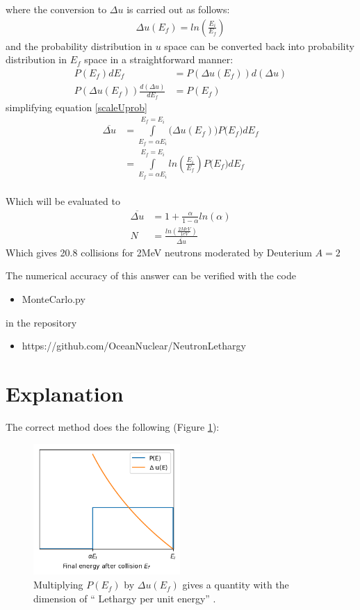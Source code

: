 \documentclass[a4paper, 12pt]{article}
\begin{document}
where the conversion to $\Delta u$ is carried out as follows:
\begin{align}
	\Delta u (E_f) = ln\left(\frac{E_i}{E_f} \right)
\end{align}
and the probability distribution in $u$ space can be converted back into probability distribution in $E_f$ space in a straightforward manner:
\begin{align}
	P(E_f) dE_f &= P(\Delta u (E_f) ) {d(\Delta u)}	\\
	P(\Delta u (E_f) ) \frac{d(\Delta u)}{dE_f} &= P(E_f)
\end{align}
simplifying equation \ref{scaleUprob}
\begin{align}
	\overline{\Delta u} &=	\int\limits_{E_f=\alpha E_i}^{E_f=E_i} \big(\Delta u (E_f) \big) P\big(E_f \big) dE_f	\\
						&=	\int\limits_{E_f=\alpha E_i}^{E_f=E_i} ln \left( \frac{E_i}{E_f} \right) P\big(E_f \big) dE_f \\
\end{align}

Which will be evaluated to
\begin{align}
	\overline{\Delta u} &=	1+\frac{\alpha}{1-\alpha} ln(\alpha)	\\
	N &= \frac{ ln \left( \frac{2 MeV}{1eV} \right)} { \overline{\Delta u} }
\end{align}
Which gives 20.8 collisions for 2MeV neutrons moderated by Deuterium $A=2$

The numerical accuracy of this answer can be verified with the code
\begin{itemize}
	\item MonteCarlo.py
\end{itemize}

in the repository 
\begin{itemize}
	\item https://github.com/OceanNuclear/NeutronLethargy
\end{itemize}

\section{Explanation}
	The correct method does the following (Figure \ref{Fig1}):
	
	\begin{figure}[H]
	\centering
	\includegraphics[height=5cm]{Fig1.png}
	\caption{Multiplying $P(E_f)$ by $\Delta u(E_f)$ gives a quantity with the dimension of `` Lethargy per unit energy'' .
	}\label{Fig1}
	\end{figure}
	
\end{document}
